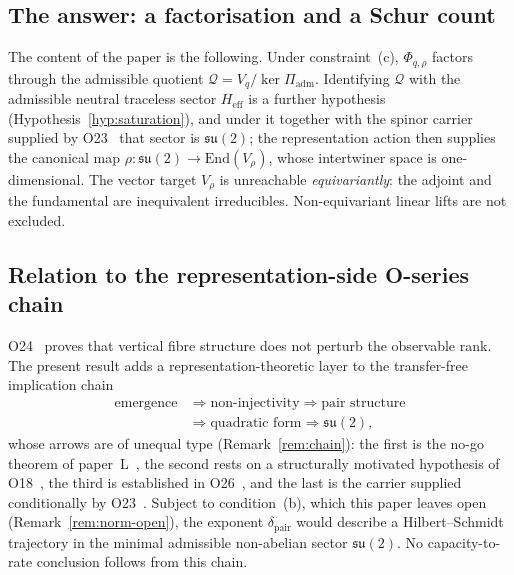 \documentclass[11pt,a4paper]{article}
\theoremstyle{remark}
\begin{document}
  \subsection{The answer: a factorisation and a Schur count}

    The content of the paper is the following.
    Under constraint~(c), $\Phi_{q,\rho}$ factors through the admissible quotient
    $\mathcal{Q} = V_q / \ker \Pi_{\mathrm{adm}}$.
    Identifying $\mathcal{Q}$ with the admissible neutral traceless sector $H_{\mathrm{eff}}$ is a
    further hypothesis (Hypothesis~\ref{hyp:saturation}), and under it together with the spinor
    carrier supplied by O23~\cite{Beau2026a27} that sector is $\mathfrak{su}(2)$; the
    representation action then supplies the canonical map $\rho \colon \mathfrak{su}(2) \to
    \mathrm{End}(V_\rho)$, whose intertwiner space is one-dimensional.
    The vector target $V_\rho$ is unreachable \emph{equivariantly}: the adjoint and the fundamental
    are inequivalent irreducibles.  Non-equivariant linear lifts are not excluded.

  \subsection{Relation to the representation-side O-series chain}

    O24~\cite{Beau2026a28} proves that vertical fibre structure does not perturb the
    observable rank.  The present result adds a representation-theoretic layer to the
    transfer-free implication chain
    \begin{align*}
      \text{emergence} &\Rightarrow \text{non-injectivity} \Rightarrow \text{pair structure}\\
      &\Rightarrow \text{quadratic form} \Rightarrow \mathfrak{su}(2),
    \end{align*}
    whose arrows are of unequal type (Remark~\ref{rem:chain}): the first is the no-go theorem of
    paper~L~\cite{Beau2026l}, the second rests on a structurally motivated hypothesis of
    O18~\cite{Beau2026a22}, the third is established in O26~\cite{Beau2026a30}, and the last is the
    carrier supplied conditionally by O23~\cite{Beau2026a27}.
    Subject to condition~(b), which this paper leaves open (Remark~\ref{rem:norm-open}), the
    exponent $\delta_{\mathrm{pair}}$ would describe a Hilbert--Schmidt trajectory in the minimal
    admissible non-abelian sector $\mathfrak{su}(2)$.
    No capacity-to-rate conclusion follows from this chain.
\end{document}
